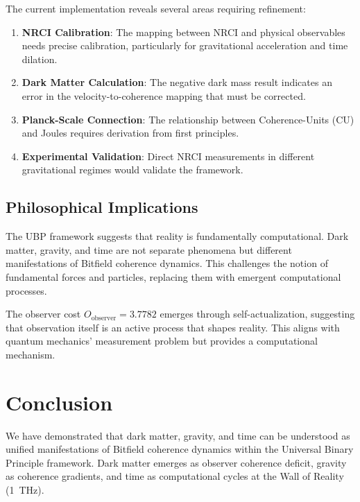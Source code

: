 \documentclass[12pt,a4paper]{article}
\begin{document}
The current implementation reveals several areas requiring refinement:

\begin{enumerate}
\item \textbf{NRCI Calibration}: The mapping between NRCI and physical observables needs precise calibration, particularly for gravitational acceleration and time dilation.

\item \textbf{Dark Matter Calculation}: The negative dark mass result indicates an error in the velocity-to-coherence mapping that must be corrected.

\item \textbf{Planck-Scale Connection}: The relationship between Coherence-Units (CU) and Joules requires derivation from first principles.

\item \textbf{Experimental Validation}: Direct NRCI measurements in different gravitational regimes would validate the framework.
\end{enumerate}

\subsection{Philosophical Implications}

The UBP framework suggests that reality is fundamentally computational. Dark matter, gravity, and time are not separate phenomena but different manifestations of Bitfield coherence dynamics. This challenges the notion of fundamental forces and particles, replacing them with emergent computational processes.

The observer cost $O_{\text{observer}} = 3.7782$ emerges through self-actualization, suggesting that observation itself is an active process that shapes reality. This aligns with quantum mechanics' measurement problem but provides a computational mechanism.

\section{Conclusion}

We have demonstrated that dark matter, gravity, and time can be understood as unified manifestations of Bitfield coherence dynamics within the Universal Binary Principle framework. Dark matter emerges as observer coherence deficit, gravity as coherence gradients, and time as computational cycles at the Wall of Reality (\SI{1}{THz}).
\end{document}
